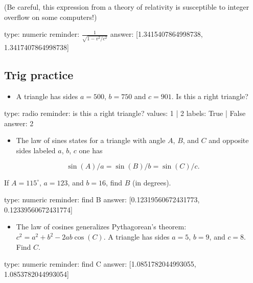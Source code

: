 \documentclass[12pt]{article}
\begin{document}
(Be careful, this expression from a theory of relativity is susceptible
to integer overflow on some computers!)

\begin{answer}
    type: numeric
    reminder: \( \frac{1}{\sqrt{1 - v^2/c^2}} \)
    answer: [1.3415407864998738, 1.3417407864998738]

\end{answer}

\subsection{Trig practice}

\begin{itemize}
\itemsep1pt\parskip0pt
\item
  A triangle has sides $a=500$, $b=750$ and $c=901$. Is this a right
  triangle?
\end{itemize}

\begin{answer}
type: radio
reminder: is this a right triangle?
values: 1 | 2
labels: True | False
answer: 2
\end{answer}

\begin{itemize}
\itemsep1pt\parskip0pt
\item
  The law of sines states for a triangle with angle $A$, $B$, and $C$
  and opposite sides labeled $a$, $b$, $c$ one has
\end{itemize}

\[ 
\sin(A)/a = \sin(B)/b = \sin(C)/c.
\]

If $A=115^\circ$, $a=123$, and $b=16$, find $B$ (in degrees).

\begin{answer}
    type: numeric
    reminder: find B
    answer: [0.12319560672431773, 0.12339560672431774]

\end{answer}

\begin{itemize}
\itemsep1pt\parskip0pt
\item
  The law of cosines generalizes Pythagorean's theorem:
  $c^2 = a^2 +   b^2 - 2ab \cos(C)$. A triangle has sides $a=5$, $b=9$,
  and $c=8$. Find $C$.
\end{itemize}

\begin{answer}
    type: numeric
    reminder: find C
    answer: [1.0851782044993055, 1.0853782044993054]

\end{answer}
\end{document}
